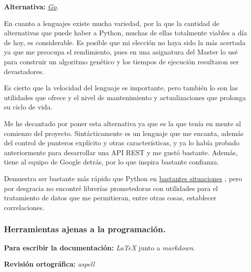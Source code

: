 \textbf{Alternativa:} \href{https://go.dev/}{\textit{Go}}.

En cuanto a lenguajes existe mucha variedad, por la que la cantidad de alternativas que puede haber a Python, muchas de ellas totalmente viables a día de hoy, es considerable. Es posible que mi elección no haya sido la más acertada ya que me preocupa el rendimiento, pues en una asignatura del Master lo usé para construir un algoritmo genético y los tiempos de ejecución resultaron ser devastadores.

Es cierto que la velocidad del lenguaje \cite{languagespeed} es importante, pero también lo son las utilidades que ofrece y el nivel de mantenimiento y actualizaciones que prolonga su ciclo de vida.

Me he decantado por poner esta alternativa ya que es la que tenía en mente al comienzo del proyecto. Sintácticamente es un lenguaje que me encanta, además del control de punteros explícito y otras características, y ya lo había probado anteriormente para desarrollar una API REST y me gustó bastante. Además, tiene al equipo de Google detrás, por lo que inspira bastante confianza.

Demuestra ser bastante más rápido que Python en \href{https://benchmarksgame-team.pages.debian.net/benchmarksgame/fastest/go-python3.html}{bastantes situaciones} \cite{languagespeed}, pero por desgracia no encontré librerías prometedoras con utilidades para el tratamiento de datos que me permitieran, entre otras cosas, establecer correlaciones.

\subsubsection{Herramientas ajenas a la programación.}

\textbf{Para escribir la documentación:} \textit{LaTeX} junto a \textit{markdown}.

\textbf{Revisión ortográfica:} \textit{aspell}